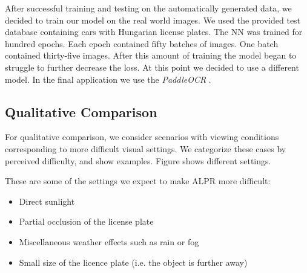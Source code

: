 After successful training and testing on the automatically generated data, we
decided to train our model on the real world images.  We used the provided test
database containing cars with Hungarian license plates.  The \ac{NN} was trained
for hundred epochs.  Each epoch contained fifty batches of images.  One batch
contained thirty-five images.  After this amount of training the model began to
struggle to further decrease the loss.  At this point we decided to use
a different model.  In the final application we use the \emph{PaddleOCR}
\cite{DBLP:journals/corr/abs-2009-09941}.

\subsection{Qualitative Comparison}
For qualitative comparison, we consider scenarios with viewing conditions
corresponding to more difficult visual settings. We categorize these cases by
perceived difficulty, and show examples. Figure  shows
different settings. 

These are some of the settings we expect to make \ac{ALPR} more
difficult:
\begin{itemize}
    \item Direct sunlight 
    \item Partial occlusion of the license plate 
    \item Miscellaneous weather effects such as rain or fog
    \item Small size of the licence plate (i.e. the object is further away)
\end{itemize}

